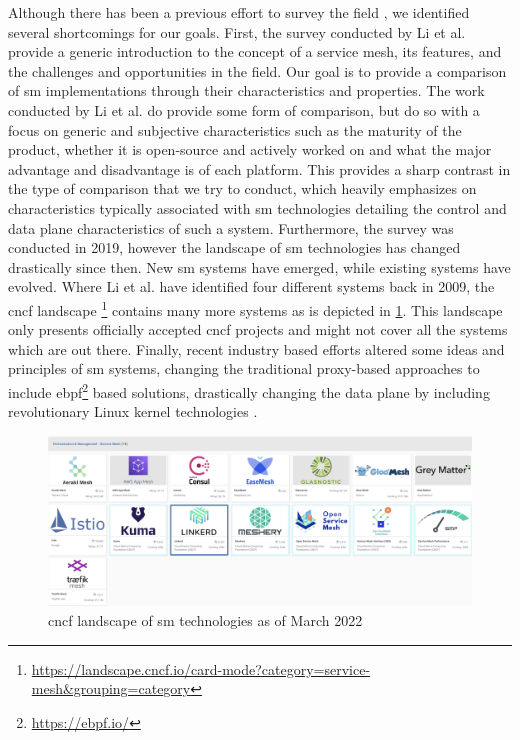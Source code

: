Although there has been a previous effort to survey the field \cite{service-mesh-survey}, we identified several shortcomings for our goals. First, the survey conducted by Li et al. provide a generic introduction to the concept of a service mesh, its features, and the challenges and opportunities in the field. Our goal is to provide a comparison of \gls{sm} implementations through their characteristics and properties. The work conducted by Li et al. do provide some form of comparison, but do so with a focus on generic and subjective characteristics such as the maturity of the product, whether it is open-source and actively worked on and what the major advantage and disadvantage is of each platform. This provides a sharp contrast in the type of comparison that we try to conduct, which heavily emphasizes on characteristics typically associated with  \gls{sm} technologies detailing the control and data plane characteristics of such a system. Furthermore, the survey was conducted in 2019, however the landscape of \gls{sm} technologies has changed drastically since then. New \gls{sm} systems have emerged, while existing systems have evolved. Where Li et al. \cite{service-mesh-survey} have identified four different systems back in 2009, the \gls{cncf} landscape \cite{cncf-landscape}\footnote{\url{https://landscape.cncf.io/card-mode?category=service-mesh&grouping=category}} contains many more systems as is depicted in \cref{fig:cncf-landscape-sm}. This landscape only presents officially accepted \gls{cncf} projects and might not cover all the systems which are out there. Finally, recent industry based efforts altered some ideas and principles of \gls{sm} systems, changing the traditional proxy-based approaches to include  \gls{ebpf}\footnote{\url{https://ebpf.io/}} based solutions, drastically changing the data plane by including revolutionary Linux kernel technologies \cite{istio-merbridge, cilium-ebpf-mesh}.


\begin{figure}[t]
    \centering
    \includegraphics[width=0.9\linewidth]{3_systems_survey/figures/cncf-landscape-service-mesh}
    \caption{\gls{cncf} landscape of \gls{sm} technologies as of March 2022}
    \label{fig:cncf-landscape-sm}
\end{figure}

